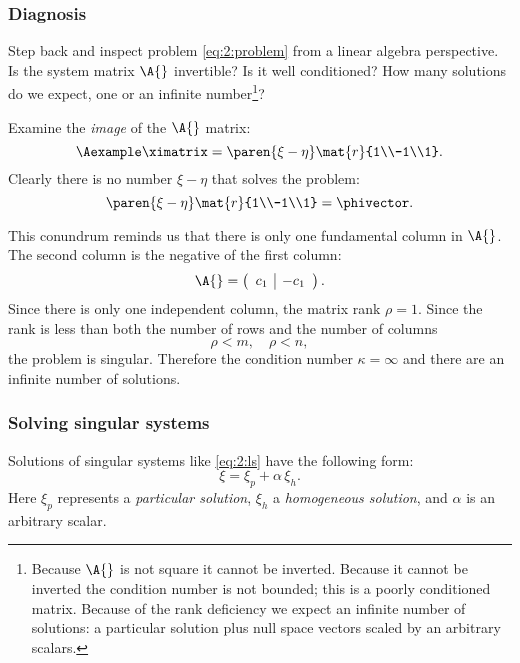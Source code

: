 \subsubsection{Diagnosis}
Step back and inspect problem \eqref{eq:2:problem} from a linear algebra perspective. Is the system matrix $\A{}$ invertible? Is it well conditioned? How many solutions do we expect, one or an infinite number\footnote{Because $\A{}$ is not square it cannot be inverted. Because it cannot be inverted the condition number is not bounded; this is a poorly conditioned matrix. Because of the rank deficiency we expect an infinite number of solutions: a particular solution plus null space vectors scaled by an arbitrary scalars.}?

Examine the \textit{image} of the $\A{}$ matrix:
\begin{equation}
  \Aexample \ximatrix = \paren{\xi-\eta}\mat{r}{1\\-1\\1}.
\end{equation}
Clearly there is no number $\xi-\eta$ that solves the problem:
\begin{equation}
 \paren{\xi-\eta}\mat{r}{1\\-1\\1} = \phivector.
\end{equation}

This conundrum reminds us that there is only one fundamental column in $\A{}$. The second column is the negative of the first column:
\begin{equation}
  \A{} =
\left(
\begin{array}{r|r}
  c_{1} & -c_{1}    
\end{array}
\right).
\end{equation}
Since there is only one independent column, the matrix rank $\rho = 1$. Since the rank is less than both the number of rows and the number of columns
\begin{equation}
  \rho < m, \quad \rho < n,
\end{equation}
the problem is singular. Therefore the condition number $\kappa = \infty$ and there are an infinite number of solutions.

\subsubsection{Solving singular systems}
Solutions of singular systems like \eqref{eq:2:ls} have the following form:
\begin{equation}
  \xi = \xi_{p} + \alpha\, \xi_{h}.
  \label{eq:fact}
\end{equation}
Here $\xi_{p}$ represents a \textit{particular solution}, $\xi_{h}$ a \textit{homogeneous solution}, and $\alpha$ is an arbitrary scalar. 

